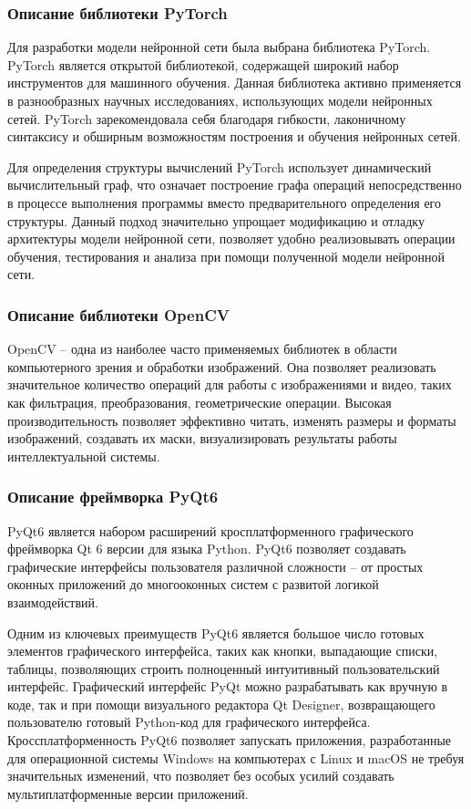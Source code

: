 \subsubsection{Описание библиотеки PyTorch}
	
Для разработки модели нейронной сети была выбрана библиотека PyTorch. PyTorch является открытой библиотекой, содержащей широкий	набор инструментов для машинного обучения. Данная библиотека активно применяется в разнообразных научных исследованиях, использующих модели нейронных сетей. PyTorch зарекомендовала себя благодаря гибкости, лаконичному синтаксису и обширным возможностям построения и обучения нейронных сетей. 

Для определения структуры вычислений PyTorch использует динамический вычислительный граф, что означает построение графа операций непосредственно в процессе выполнения программы вместо предварительного определения его структуры. Данный подход значительно упрощает модификацию и отладку архитектуры модели нейронной сети, позволяет удобно реализовывать операции обучения, тестирования и анализа при помощи полученной модели нейронной сети. 

\subsubsection{Описание библиотеки OpenCV}

OpenCV -- одна из наиболее часто применяемых библиотек в области компьютерного зрения и обработки изображений. Она позволяет реализовать значительное количество операций для работы с изображениями и видео, таких как фильтрация, преобразования, геометрические операции. Высокая производительность позволяет эффективно читать, изменять размеры и форматы изображений, создавать их маски, визуализировать результаты работы интеллектуальной системы. 

\subsubsection{Описание фреймворка PyQt6}

PyQt6 является набором расширений кросплатформенного графического фреймворка Qt 6 версии для языка Python. PyQt6 позволяет создавать графические интерфейсы пользователя различной сложности -- от простых оконных приложений до многооконных систем с развитой логикой взаимодействий. 

Одним из ключевых преимуществ PyQt6 является большое число готовых элементов графического интерфейса, таких как кнопки, выпадающие списки, таблицы, позволяющих строить полноценный интуитивный пользовательский интерфейс. Графический интерфейс PyQt можно разрабатывать как вручную в коде, так и при помощи визуального редактора Qt Designer, возвращающего пользователю готовый Python-код для графического интерфейса. Кроссплатформенность PyQt6 позволяет запускать приложения, разработанные для операционной системы Windows на компьютерах с Linux и macOS не требуя значительных изменений, что позволяет без особых усилий создавать мультиплатформенные версии приложений.

